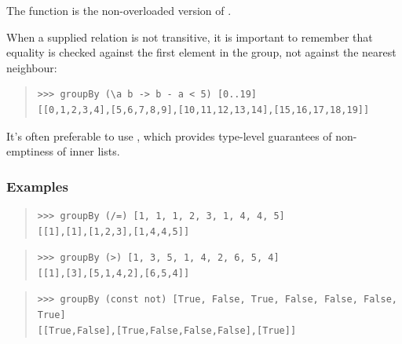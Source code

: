 \begin{haddockdesc}
\item[\begin{tabular}{@{}l}
groupBy :: (a -> a -> Bool) -> {\char 91}a{\char 93} -> {\char 91}{\char 91}a{\char 93}{\char 93}
\end{tabular}]
{\haddockbegindoc
The  function is the non-overloaded version of .\par
When a supplied relation is not transitive, it is important
 to remember that equality is checked against the first element in the group,
 not against the nearest neighbour:\par
\begin{quote}
{\haddockverb\begin{verbatim}
>>> groupBy (\a b -> b - a < 5) [0..19]
[[0,1,2,3,4],[5,6,7,8,9],[10,11,12,13,14],[15,16,17,18,19]]

\end{verbatim}}
\end{quote}
It's often preferable to use ,
 which provides type-level guarantees of non-emptiness of inner lists.\par
\subsubsection*{\textbf{Examples}}
\begin{quote}
{\haddockverb\begin{verbatim}
>>> groupBy (/=) [1, 1, 1, 2, 3, 1, 4, 4, 5]
[[1],[1],[1,2,3],[1,4,4,5]]

\end{verbatim}}
\end{quote}
\begin{quote}
{\haddockverb\begin{verbatim}
>>> groupBy (>) [1, 3, 5, 1, 4, 2, 6, 5, 4]
[[1],[3],[5,1,4,2],[6,5,4]]

\end{verbatim}}
\end{quote}
\begin{quote}
{\haddockverb\begin{verbatim}
>>> groupBy (const not) [True, False, True, False, False, False, True]
[[True,False],[True,False,False,False],[True]]

\end{verbatim}}
\end{quote}}
\end{haddockdesc}

